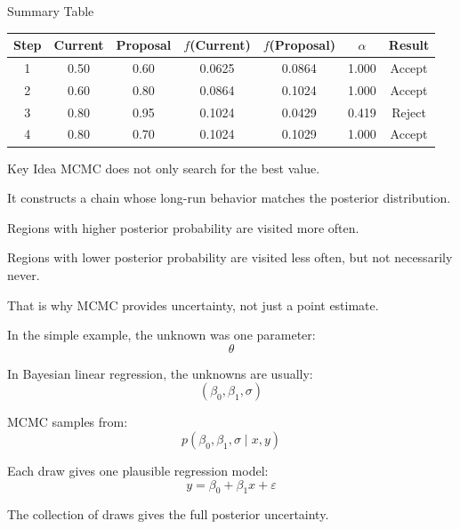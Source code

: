 \documentclass[aspectratio=43,11pt]{beamer}
\begin{document}
\begin{frame}{Summary Table}
\centering
\small
\begin{tabular}{ccccccc}
\toprule
Step & Current & Proposal & $f$(Current) & $f$(Proposal) & $\alpha$ & Result \\
\midrule
1 & 0.50 & 0.60 & 0.0625 & 0.0864 & 1.000 & Accept \\
2 & 0.60 & 0.80 & 0.0864 & 0.1024 & 1.000 & Accept \\
3 & 0.80 & 0.95 & 0.1024 & 0.0429 & 0.419 & Reject \\
4 & 0.80 & 0.70 & 0.1024 & 0.1029 & 1.000 & Accept \\
\bottomrule
\end{tabular}
\end{frame}

\begin{frame}{Key Idea}
MCMC does not only search for the best value.

\vspace{0.4cm}
It constructs a chain whose long-run behavior matches the posterior distribution.

\vspace{0.4cm}
Regions with higher posterior probability are visited more often.

\vspace{0.4cm}
Regions with lower posterior probability are visited less often, but not necessarily never.

\vspace{0.4cm}
That is why MCMC provides uncertainty, not just a point estimate.
\end{frame}

\begin{frame}{} %
In the simple example, the unknown was one parameter:
\[
\theta
\]

In Bayesian linear regression, the unknowns are usually:
\[
(\beta_0,\beta_1,\sigma)
\]

MCMC samples from:
\[
p(\beta_0,\beta_1,\sigma \mid x,y)
\]

Each draw gives one plausible regression model:
\[
y = \beta_0 + \beta_1 x + \varepsilon
\]

The collection of draws gives the full posterior uncertainty.
\end{frame}
\end{document}
